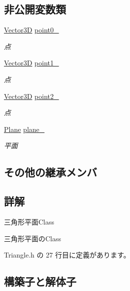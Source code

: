 \subsection*{非公開変数類}
\begin{DoxyCompactItemize}
\item 
\mbox{\hyperlink{class_vector3_d}{Vector3D}} \mbox{\hyperlink{class_triangle_a307e9043e9755e06387458cd84993662}{point0\+\_\+}}
\begin{DoxyCompactList}\small\item\em 点 \end{DoxyCompactList}\item 
\mbox{\hyperlink{class_vector3_d}{Vector3D}} \mbox{\hyperlink{class_triangle_aa846eb6b25478f0227225c74c53bb5c1}{point1\+\_\+}}
\begin{DoxyCompactList}\small\item\em 点 \end{DoxyCompactList}\item 
\mbox{\hyperlink{class_vector3_d}{Vector3D}} \mbox{\hyperlink{class_triangle_af1850003b6274357b9b081395e1ab4e8}{point2\+\_\+}}
\begin{DoxyCompactList}\small\item\em 点 \end{DoxyCompactList}\item 
\mbox{\hyperlink{class_plane}{Plane}} \mbox{\hyperlink{class_triangle_a93586199c2c173771f2e167f477eaa70}{plane\+\_\+}}
\begin{DoxyCompactList}\small\item\em 平面 \end{DoxyCompactList}\end{DoxyCompactItemize}
\subsection*{その他の継承メンバ}


\subsection{詳解}
三角形平面\+Class 

三角形平面の\+Class 

 Triangle.\+h の 27 行目に定義があります。



\subsection{構築子と解体子}
\mbox{\label{class_triangle_aaefe4ed500c07918d30c6f0e286332c5}} 
